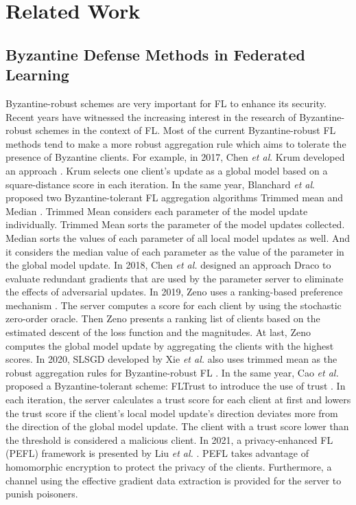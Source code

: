 \documentclass[journal]{IEEEtran}
\begin{document}
\section{Related Work}

\subsection{Byzantine Defense Methods in Federated Learning}
Byzantine-robust schemes are very important for FL to enhance its security. Recent years have witnessed the increasing interest in the research of Byzantine-robust schemes in the context of FL. Most of the current Byzantine-robust FL methods tend to make a more robust aggregation rule which aims to tolerate the presence of Byzantine clients. 
For example, in 2017, Chen \textit{et al}. Krum developed an approach \cite{ref_12_defense}. Krum selects one client's update as a global model based on a square-distance score in each iteration. 
In the same year, Blanchard \textit{et al}. proposed two Byzantine-tolerant FL aggregation algorithms Trimmed mean and Median \cite{ref_16_defense}. Trimmed Mean considers each parameter of the model update individually. Trimmed Mean sorts the parameter of the model updates collected. Median sorts the values of each parameter of all local model updates as well. And it considers the median value of each parameter as the value of the parameter in the global model update. 
In 2018, Chen \textit{et al.} designed an approach Draco to evaluate redundant gradients that are used by the parameter server to eliminate the effects of adversarial updates. 
In 2019, Zeno uses a ranking-based preference mechanism \cite{ref_15_defense}. The server computes a score for each client by using the stochastic zero-order oracle. Then Zeno presents a ranking list of clients based on the estimated descent of the loss function and the magnitudes. At last, Zeno computes the global model update by aggregating the clients with the highest scores. 
In 2020, SLSGD developed by Xie \textit{et al.} also uses trimmed mean as the robust aggregation rules for Byzantine-robust FL \cite{ref_14_defense}. 
In the same year, Cao \textit{et al.} proposed a Byzantine-tolerant scheme: FLTrust to introduce the use of trust \cite{ref_17_defense}. In each iteration, the server calculates a trust score for each client at first and lowers the trust score if the client's local model update's direction deviates more from the direction of the global model update. The client with a trust score lower than the threshold is considered a malicious client.
In 2021, a privacy-enhanced FL (PEFL) framework is presented by Liu \textit{et al.}  \cite{ref_45_defense}. PEFL takes advantage of homomorphic encryption to protect the privacy of the clients. Furthermore, a channel using the effective gradient data extraction is provided for the server to punish poisoners.
\end{document}
